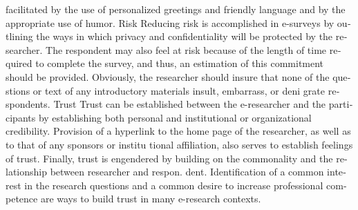 \documentclass[a4 paper,12pt]{article}\usepackage{xepersian}
\begin{document}
\begin{latin}
  \vspace{0.1cm}

\vspace{0.1cm}     
\noindent
facilitated by the use of personalized greetings and friendly language and by the appropriate use of humor. 
Risk
Reducing risk is accomplished in e-surveys by outlining the ways in which privacy and confidentiality will be protected by the researcher. The respondent may also feel at risk because of the length of time required to complete the survey, and thus, an estimation of this commitment should be provided. Obviously, the researcher should insure that none of the questions or text of any introductory materials insult, embarrass, or deni grate respondents. 
\vspace{0.1cm}
Trust 
Trust can be established between the e-researcher and the participants by establishing both personal and institutional or organizational credibility. Provision of a hyperlink to the home page of the researcher, as well as to that of any sponsors or institu tional affiliation, also serves to establish feelings of trust. Finally, trust is engendered by building on the commonality and the relationship between researcher and respon. dent. Identification of a common interest in the research questions and a common desire to increase professional competence are ways to build trust in many e-research contexts. 

\end{latin}
\end{document}
